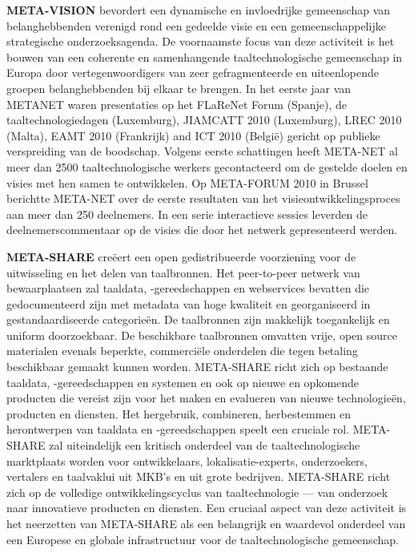\documentclass[]{../../metanetpaper}
\begin{document}
\begin{multicols}{2}
    \textbf{META-VISION} bevordert een dynamische en invloedrijke gemeenschap van belanghebbenden verenigd rond een gedeelde visie en een gemeenschappelijke strategische onderzoeksagenda. De voornaamste focus van deze activiteit is het bouwen van een coherente en samenhangende taaltechnologische gemeenschap in Europa door vertegenwoordigers van zeer gefragmenteerde en uiteenlopende groepen belanghebbenden bij elkaar te brengen. In het eerste jaar van METANET waren presentaties op het FLaReNet Forum (Spanje), de taaltechnologiedagen (Luxemburg), JIAMCATT 2010 (Luxemburg), LREC 2010 (Malta), EAMT 2010 (Frankrijk) and ICT 2010 (Belgi{\"e}) gericht op publieke verspreiding van de boodschap. Volgens eerste schattingen heeft META-NET al meer dan 2500 taaltechnologische werkers gecontacteerd om de gestelde doelen en visies met hen samen te ontwikkelen. Op META-FORUM 2010 in Brussel berichtte META-NET over de eerste resultaten van het visieontwikkelingsproces aan meer dan 250 deelnemers. In een serie interactieve sessies leverden de deelnemerscommentaar op de visies die door het netwerk gepresenteerd werden.

    \textbf{META-SHARE} cre{\"e}ert een open gedistribueerde voorziening voor de uitwisseling en het delen van taalbronnen. Het peer-to-peer netwerk van bewaarplaatsen zal taaldata, -gereedschappen en webservices bevatten die gedocumenteerd zijn met metadata van hoge kwaliteit en georganiseerd in gestandaardiseerde categorie{\"e}n. De taalbronnen zijn makkelijk toegankelijk en uniform doorzoekbaar. De beschikbare taalbronnen omvatten vrije, open source materialen evenals beperkte, commerci{\"e}le onderdelen die tegen betaling beschikbaar gemaakt kunnen worden. META-SHARE richt zich op bestaande taaldata, -gereedschappen en systemen en ook op nieuwe en opkomende producten die vereist zijn voor het maken en evalueren van nieuwe technologie{\"e}n, producten en diensten. Het hergebruik, combineren, herbestemmen en herontwerpen van taaldata en -gereedschappen speelt een cruciale rol. META-SHARE zal uiteindelijk een kritisch onderdeel van de taaltechnologische marktplaats worden voor ontwikkelaars, lokalisatie-experts, onderzoekers, vertalers en taalvaklui uit MKB's en uit grote bedrijven. META-SHARE richt zich op de volledige ontwikkelingscyclus van taaltechnologie --- van onderzoek naar innovatieve producten en diensten. Een cruciaal aspect van deze activiteit is het neerzetten van META-SHARE als een belangrijk en waardevol onderdeel van een Europese en globale infrastructuur voor de taaltechnologische gemeenschap.


\end{multicols}
\end{document}
